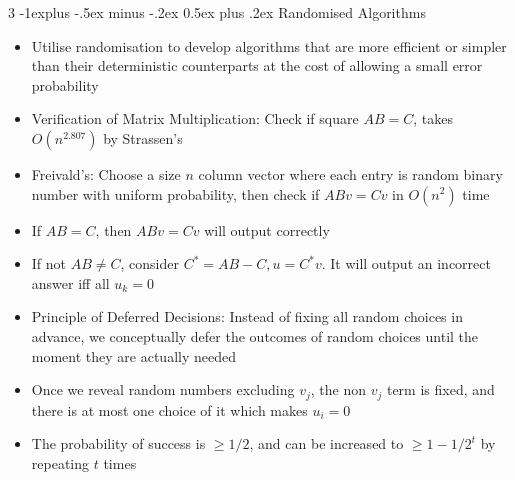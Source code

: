 \documentclass[10pt, landscape]{article}
\makeatletter
\renewcommand{\section}{\@startsection{section}{1}{0mm}%
                                {-1ex plus -.5ex minus -.2ex}%
                                {0.5ex plus .2ex}%
                                {\normalfont\large\bfseries}}
\renewcommand{\section}{\@startsection{section}{2}{0mm}%
                                {-1explus -.5ex minus -.2ex}%
                                {0.5ex plus .2ex}%
                                {\normalfont\normalsize\bfseries}}
\makeatother
\begin{document}
\begin{multicols*}{3}
\section{Randomised Algorithms}
\begin{itemize}
    \item Utilise randomisation to develop algorithms that are more efficient or simpler than their deterministic counterparts at the cost of allowing a small error probability
    \item Verification of Matrix Multiplication: Check if square $AB=C$, takes $O(n^{2.807})$ by Strassen's
    \item Freivald's: Choose a size $n$ column vector where each entry is random binary number with uniform probability, then check if $ABv=Cv$ in $O(n^2)$ time
    \item If $AB=C$, then $ABv=Cv$ will output correctly
    \item If not $AB\neq C$, consider $C^*=AB-C, u=C^*v$. It will output an incorrect answer iff all $u_k=0$
    \item Principle of Deferred Decisions: Instead of fixing all random choices in advance, we conceptually defer the outcomes of random choices until the moment they are actually needed
    \item Once we reveal random numbers excluding $v_j$, the non $v_j$ term is fixed, and there is at most one choice of it which makes $u_i=0$
    \item The probability of success is $\geq 1/2$, and can be increased to $\geq 1-1/2^t$ by repeating $t$ times
\end{itemize}


\end{multicols*}
\end{document}
